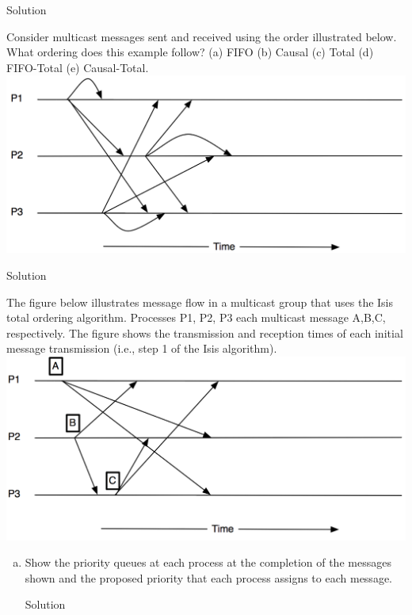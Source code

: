 \documentclass{article}
\begin{document}
\begin{spacing}{1.1}
\begin{homeworkProblem}
\begin{homeworkSection}{Solution}
	\end{homeworkSection}
\end{homeworkProblem}
\newpage
\begin{homeworkProblem}
	Consider multicast messages sent and received using the order illustrated below. What ordering does this example follow? (a) FIFO (b) Causal (c) Total (d) FIFO-Total (e) Causal-Total.
	\\ \includegraphics[width=\linewidth]{prob5.png}
	\begin{homeworkSection}{Solution}
		
	\end{homeworkSection}
\end{homeworkProblem}
\newpage
\begin{homeworkProblem}
The figure below illustrates message flow in a multicast group that uses the Isis total ordering algorithm. Processes P1, P2, P3 each multicast message A,B,C, respectively. The figure shows the transmission and reception times of each initial message transmission (i.e., step 1 of the Isis algorithm).
	\\ \includegraphics[width=\linewidth]{prob6.png}
	\begin{enumerate}[(a)]
		\item Show the priority queues at each process at the completion of the messages shown and the proposed priority that each process assigns to each message.
			\begin{homeworkSection}{Solution}
		

\end{homeworkSection}
\end{enumerate}
\end{homeworkProblem}
\end{spacing}
\end{document}
